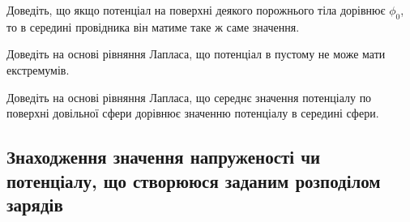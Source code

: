 \begin{problem}
    Доведіть, що якщо потенціал на поверхні деякого порожнього тіла дорівнює $\phi_0$, то в середині провідника він матиме таке ж саме значення.
\end{problem}

\begin{problem}
    Доведіть на основі рівняння Лапласа, що потенціал в пустому не може мати екстремумів.  
\end{problem}

\begin{problem}
	Доведіть на основі рівняння Лапласа, що середнє значення потенціалу по поверхні довільної сфери дорівнює значенню потенціалу в середині сфери.  
\end{problem}

\subsection*{Знаходження значення напруженості чи потенціалу, що створююся заданим розподілом зарядів}

